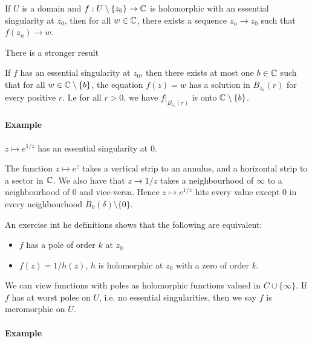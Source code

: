 \begin{theorem}
If $U$ is a domain and $f : U \setminus \{ z_0 \} \rightarrow \mathbb{C}$ is holomorphic with an essential singularity at $z_0$, then for all $w \in \mathbb{C}$, there exists a sequence $z_n \rightarrow z_0$ such that $f(z_n) \rightarrow w$.
\end{theorem}

There is a stronger result
\begin{theorem}
  If $f$ has an essential singularity at $z_0$, then there exists at most one $b \in \mathbb{C}$ such that for all $w \in \mathbb{C} \setminus \{ b \}$, the equation $f(z) = w$ has a solution in $B_{z_0}(r)$ for every positive $r$.
  I.e for all $r > 0$, we have $f\Big\rvert_{B_{z_0}(r)}$ is onto $\mathbb{C} \setminus \{ b \}$.
\end{theorem}

\paragraph{Example}
$z \mapsto e^{1/z}$ has an essential singularity at $0$.

\begin{remark}
  The function $z \mapsto e^z$ takes a vertical strip to an annulus, and a horizontal strip to a sector in $\mathbb{C}$.
We also have that $z \rightarrow 1/z$ takes a neighbourhood of $\infty$ to a neighbourhood of $0$ and vice-versa.
Hence $z \mapsto e^{1/z}$ hits every value except $0$ in every neighbourhood $B_0(\delta) \setminus \{ 0 \}$.
\end{remark}

\begin{remark}
  An exercise int he definitions shows that the following are equivalent:
  \begin{itemize}
  \item $f$ has a pole of order $k$ at $z_0$
  \item $f(z) = 1/h(z)$, $h$ is holomorphic at $z_0$ with a zero of order $k$.
  \end{itemize}

We can view functions with poles as holomorphic functions valued in $C \cup \{ \infty \}$.
If $f$ has at worst poles on $U$, i.e. no essential singularities, then we say $f$ is meromorphic on $U$.
\end{remark}

\paragraph{Example}

